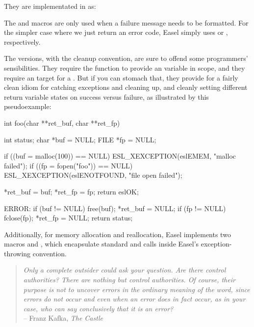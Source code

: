 They are implementated in  as:



The  and  macros are only used when
a failure message needs to be formatted. For the simpler case where we
just return an error code, Easel simply uses  or
, respectively.

The  versions, with the cleanup convention, are sure to
offend some programmers' sensibilities. They require the function to
provide an  variable in scope, and they require an
 target for a . But if you can stomach that,
they provide for a fairly clean idiom for catching exceptions and
cleaning up, and cleanly setting different return variable states on
success versus failure, as illustrated by this pseudoexample:

\begin{cchunk}
int 
foo(char **ret_buf, char **ret_fp)
{
    int status;
    char *buf = NULL;
    FILE *fp  = NULL;

    if ((buf = malloc(100))  == NULL) ESL_XEXCEPTION(eslEMEM,      "malloc failed");
    if ((fp  = fopen("foo")) == NULL) ESL_XEXCEPTION(eslENOTFOUND, "file open failed");

    *ret_buf = buf;
    *ret_fp  = fp;
    return eslOK;

  ERROR:
    if (buf != NULL) free(buf);  *ret_buf = NULL;
    if (fp  != NULL) fclose(fp); *ret_fp  = NULL;
    return status;
}
\end{cchunk}

Additionally, for memory allocation and reallocation, Easel implements
two macros  and , which
encapsulate standard  and  calls
inside Easel's exception-throwing convention.


\vspace*{\fill}
\begin{quote}
\emph{Only a complete outsider could ask your question. Are there
control authorities? There are nothing but control authorities. Of
course, their purpose is not to uncover errors in the ordinary meaning
of the word, since errors do not occur and even when an error does in
fact occur, as in your case, who can say conclusively that it is an
error?}\\ \hspace*{\fill} -- Franz Kafka, \emph{The Castle}
\end{quote}     


